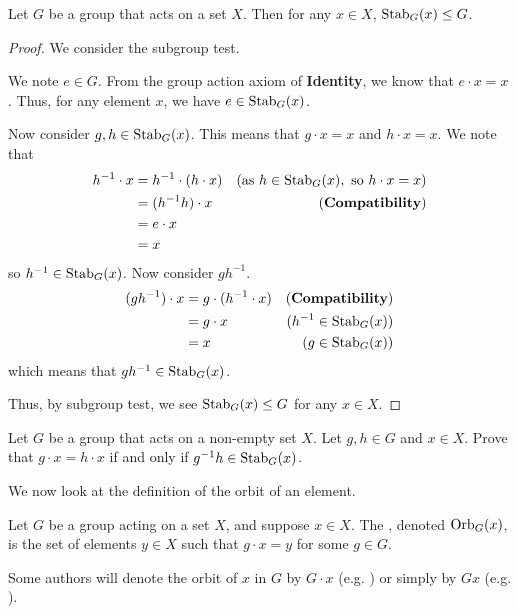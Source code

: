 \begin{lemma}\label{lemma-stabilizer-is-subgroup}
    Let $G$ be a group that acts on a set $X$. Then for any $x \in X$, $\mathrm{Stab}_{G}(x) \leq G$.
\end{lemma}
\begin{proof}
    We consider the subgroup test.

    We note $e \in G$. From the group action axiom of \textbf{Identity}, we know that $e \cdot x = x$. Thus, for any element $x$, we have $e \in \mathrm{Stab}_{G}(x)$.

    Now consider $g, h \in \mathrm{Stab}_{G}(x)$. This means that $g\cdot x = x$ and $h \cdot x = x$. We note that
    \begin{align*}
        h^{-1} \cdot x &= h^{-1} \cdot (h \cdot x) & (\text{as } h \in \mathrm{Stab}_{G}(x), \text{ so } h\cdot x = x)\\
        &= (h^{-1}h) \cdot x & (\text{\textbf{Compatibility}})\\
        &= e \cdot x\\
        &= x
    \end{align*}
    so $h^{-1} \in \mathrm{Stab}_{G}(x)$. Now consider $gh^{-1}$.
    \begin{align*}
        (gh^{-1}) \cdot x &= g \cdot (h^{-1} \cdot x) & (\text{\textbf{Compatibility}})\\
        &= g \cdot x & (h^{-1} \in \mathrm{Stab}_{G}(x))\\
        &= x & (g \in \mathrm{Stab}_{G}(x))
    \end{align*}
    which means that $gh^{-1} \in \mathrm{Stab}_{G}(x)$.

    Thus, by subgroup test, we see $\mathrm{Stab}_{G}(x) \leq G$ for any $x \in X$.
\end{proof}

\begin{exercise}\label{exercise-group-action-outputs-equal-iff-gh^-1-in-stabilizer}
    Let $G$ be a group that acts on a non-empty set $X$. Let $g, h \in G$ and $x \in X$. Prove that $g \cdot x = h \cdot x$ if and only if $g^{-1}h \in \mathrm{Stab}_{G}(x)$.
\end{exercise}

We now look at the definition of the orbit of an element.
\begin{definition}
    Let $G$ be a group acting on a set $X$, and suppose $x \in X$. The , denoted $\mathrm{Orb}_{G}(x)$, is the set of elements $y \in X$ such that $g \cdot x = y$ for some $g \in G$.
\end{definition}
\begin{remark}
    Some authors will denote the orbit of $x$ in $G$ by $G \cdot x$ (e.g. {\cite[\S 54]{clark_1984}}) or simply by $Gx$ (e.g. {\cite[p.~58]{milne_2021}}).
\end{remark}

